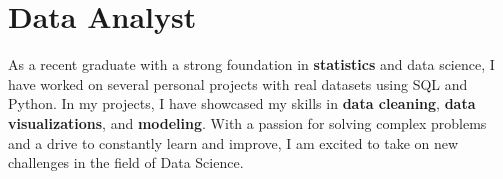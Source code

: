 
\section{Data Analyst}
\small{
    As a recent graduate with a strong foundation in \textbf{statistics} and data science, I have worked on several personal projects with real datasets using SQL and Python. In my projects, I have showcased my skills in \textbf{data cleaning}, \textbf{data visualizations}, and \textbf{modeling}. With a passion for solving complex problems and a drive to constantly learn and improve, I am excited to take on new challenges in the field of Data Science.
}
